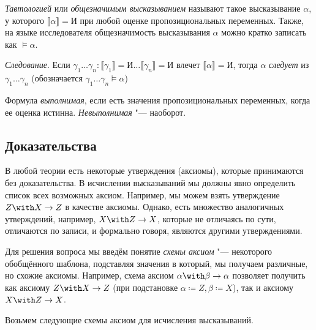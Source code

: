 \begin{definition}[тавтология] \emph{Тавтологией} или \emph{общезначимым высказыванием}
  называют такое высказывание $\alpha$, у которого $\llbracket \alpha \rrbracket
  = \texttt{И}$ при любой оценке пропозициональных переменных. Также, на языке исследователя общезначимость высказывания $\alpha$ можно кратко записать как $\models \alpha$. 
\end{definition}

\begin{definition} \emph{Следование}.
Если $\gamma_1 \dots \gamma_n : \llbracket \gamma_1 \rrbracket = \texttt{И} \dots
\llbracket \gamma_n \rrbracket = \texttt{И}$ влечет $\llbracket \alpha
\rrbracket = \texttt{И}$,  тогда $\alpha$ \emph{следует} из $\gamma_1 \dots
\gamma_n$ (обозначается $\gamma_1 \dots \gamma_n \models \alpha$) 
\end{definition}

\begin{definition} Формула \emph{выполнимая}, если есть значения
  пропозициональных переменных, когда ее оценка истинна. \emph{Невыполнимая}
  "--- наоборот.
\end{definition}


\subsection{Доказательства}

В любой теории есть некоторые утверждения (аксиомы), которые принимаются без доказательства.
В исчислении высказываний мы должны явно определить список всех возможных аксиом. 
Например, мы можем взять утверждение $Z \with X \rightarrow Z$ в качестве аксиомы.
Однако, есть множество аналогичных утверждений, например, $X \with Z \rightarrow X$,
которые не отличаясь по сути, отличаются по записи, и формально говоря, являются другими
утверждениями.

Для решения вопроса мы введём понятие \emph{схемы аксиом} "--- некоторого обобщённого
шаблона, подставляя значения в который, мы получаем различные, но схожие аксиомы. 
Например, схема аксиом $\alpha \with \beta \rightarrow \alpha$ позволяет получить как
аксиому $Z \with X \rightarrow Z$ (при подстановке $\alpha \coloneqq  Z, \beta
\coloneqq  X$), так и аксиому $X \with Z \rightarrow X$.

Возьмем следующие схемы аксиом для исчисления высказываний.

